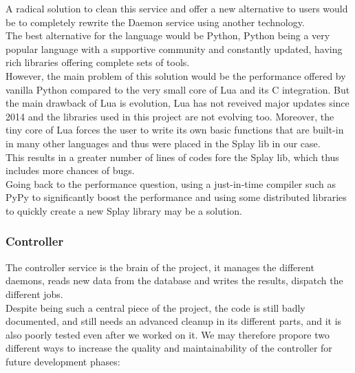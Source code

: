 \documentclass{eplmastersthesis}
\begin{document}
          A radical solution to clean this service and offer a new alternative
          to users would be to completely rewrite the Daemon service using
          another technology.\\
          The best alternative for the language would be Python, Python being a
          very popular language with a supportive community and constantly
          updated, having rich libraries offering complete sets of tools.\\
          However, the main problem of this solution would be the performance
          offered by vanilla Python compared to the very small core of Lua and
          its C integration. But the main drawback of Lua is evolution, Lua has
          not reveived major updates since 2014 and the libraries used in this
          project are not evolving too. Moreover, the tiny core of Lua forces
          the user to write its own basic functions that are built-in in many
          other languages and thus were placed in the Splay lib in our case.\\
          This results in a greater number of lines of codes fore the Splay lib,
          which thus includes more chances of bugs.\\
          Going back to the performance question, using a just-in-time compiler
          such as PyPy \cite{PyPy} to significantly boost the performance and
          using some distributed libraries to quickly create a new Splay library
          may be a solution.

        \subsubsection{Controller}

          The controller service is the brain of the project, it manages the
          different daemons, reads new data from the database and writes the
          results, dispatch the different jobs.\\
          Despite being such a central piece of the project, the code is still
          badly documented, and still needs an advanced cleanup in its
          different parts, and it is also poorly tested even after we worked
          on it. We may therefore propore two different ways to increase
          the quality and maintainability of the controller for future
          development phases:
\end{document}
